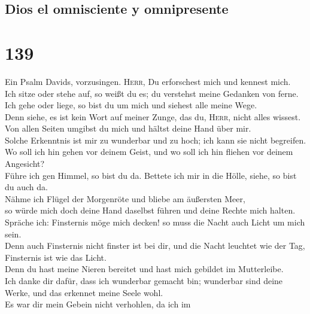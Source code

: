\hypertarget{dios-el-omnisciente-y-omnipresente}{%
\subsection{Dios el omnisciente y
omnipresente}\label{dios-el-omnisciente-y-omnipresente}}

\hypertarget{section-138}{%
\section{139}\label{section-138}}

 Ein Psalm Davids, vorzusingen. \textsc{Herr}, Du
erforschest mich und kennest mich.\\
 Ich sitze oder stehe auf, so weißt du es; du verstehst
meine Gedanken von ferne.\\
 Ich gehe oder liege, so bist du um mich und siehest alle
meine Wege.\\
 Denn siehe, es ist kein Wort auf meiner Zunge, das du,
\textsc{Herr}, nicht alles wissest.\\
 Von allen Seiten umgibst du mich und hältst deine Hand
über mir.\\
 Solche Erkenntnis ist mir zu wunderbar und zu hoch; ich
kann sie nicht begreifen.\\
 Wo soll ich hin gehen vor deinem Geist, und wo soll ich
hin fliehen vor deinem Angesicht?\\
 Führe ich gen Himmel, so bist du da. Bettete ich mir in
die Hölle, siehe, so bist du auch da.\\
 Nähme ich Flügel der Morgenröte und bliebe am äußersten
Meer,\\
 so würde mich doch deine Hand daselbst führen und deine
Rechte mich halten.\\
 Spräche ich: Finsternis möge mich decken! so muss die
Nacht auch Licht um mich sein.\\
 Denn auch Finsternis nicht finster ist bei dir, und die
Nacht leuchtet wie der Tag, Finsternis ist wie das Licht.\\
 Denn du hast meine Nieren bereitet und hast mich
gebildet im Mutterleibe.\\
 Ich danke dir dafür, dass ich wunderbar gemacht bin;
wunderbar sind deine Werke, und das erkennet meine Seele wohl.\\
 Es war dir mein Gebein nicht verhohlen, da ich im
